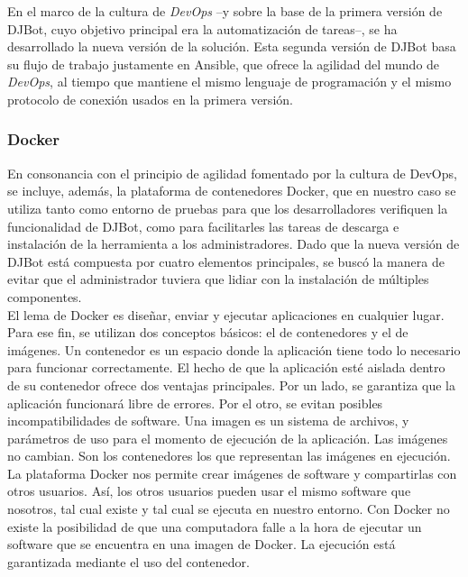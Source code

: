 \documentclass[a4paper,12pt]{article}
\begin{document}
En el marco de la cultura de \emph{DevOps} --y sobre la base de la primera versión de DJBot, cuyo objetivo principal era la automatización de tareas--, se ha desarrollado la nueva versión de la solución. Esta segunda versión de DJBot basa su flujo de trabajo justamente en Ansible, que ofrece la agilidad del mundo de \emph{DevOps}, al tiempo que mantiene el mismo lenguaje de programación y el mismo protocolo de conexión usados en la primera versión.\\


\subsubsection{Docker}
\label{sec:orgheadline11}

En consonancia con el principio de agilidad fomentado por la cultura de DevOps, se incluye, además, la plataforma de contenedores Docker, que en nuestro caso se utiliza tanto como entorno de pruebas para que los desarrolladores verifiquen la funcionalidad de DJBot, como para facilitarles las tareas de descarga e instalación de la herramienta a los administradores. Dado que la nueva versión de DJBot está compuesta por cuatro elementos principales, se buscó la manera de evitar que el administrador tuviera que lidiar con la instalación de múltiples componentes.\\

El lema de Docker es diseñar, enviar y ejecutar aplicaciones en cualquier lugar. Para ese fin, se utilizan dos conceptos básicos: el de contenedores y el de imágenes. Un contenedor es un espacio donde la aplicación tiene todo lo necesario para funcionar correctamente. El hecho de que la aplicación esté aislada dentro de su contenedor ofrece dos ventajas principales. Por un lado, se garantiza que la aplicación funcionará libre de errores. Por el otro, se evitan posibles incompatibilidades de software. Una imagen es un sistema de archivos, y parámetros de uso para el momento de ejecución de la aplicación. Las imágenes no cambian. Son los contenedores los que representan las imágenes en ejecución.\\

La plataforma Docker nos permite crear imágenes de software y compartirlas con otros usuarios. Así, los otros usuarios pueden usar el mismo software que nosotros, tal cual existe y tal cual se ejecuta en nuestro entorno. Con Docker no existe la posibilidad de que una computadora falle a la hora de ejecutar un software que se encuentra en una imagen de Docker. La ejecución está garantizada mediante el uso del contenedor.\\
\end{document}
